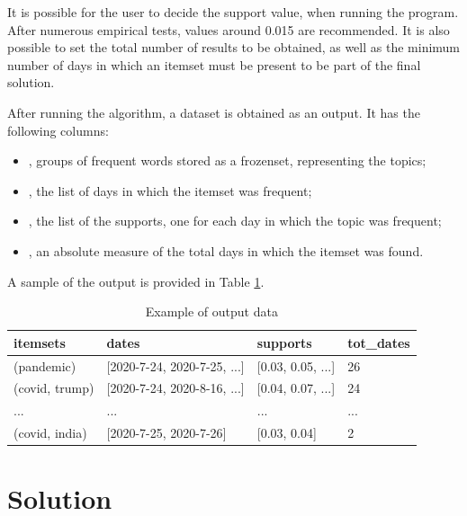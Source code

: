 It is possible for the user to decide the support value, when running the program. After numerous empirical tests, values around 0.015 are recommended. It is also possible to set the total number of results to be obtained, as well as the minimum number of days in which an itemset must be present to be part of the final solution.

After running the algorithm, a dataset is obtained as an output. It has the following columns:

\begin{itemize}
  \item {}, groups of frequent words stored as a frozenset, representing the topics;
  \item {}, the list of days in which the itemset was frequent;
  \item {}, the list of the supports, one for each day in which the topic was frequent;
  \item {}, an absolute measure of the total days in which the itemset was found.
\end{itemize}

A sample of the output is provided in Table \ref{tab_output}.

\begin{table}[h]
  \centering
  \small
  \tabcolsep=0.14cm
  \begin{tabular}{@{}llll@{}}
  \toprule
  \textbf{itemsets}         & \textbf{dates}                     & \textbf{supports}      & \textbf{tot\_dates}  \\ \midrule
  (pandemic)                & {[}2020-7-24, 2020-7-25, ...{]}    & {[}0.03, 0.05, ...{]}  & 26                   \\
  (covid, trump)            & {[}2020-7-24, 2020-8-16, ...{]}    & {[}0.04, 0.07, ...{]}  & 24                   \\
  ...                       & ...                                & ...                    & ...                  \\
  (covid, india)          & {[}2020-7-25, 2020-7-26{]}           & {[}0.03, 0.04{]}       & 2                    \\ \bottomrule
  \end{tabular}
  \caption{Example of output data \label{tab_output}}
\end{table}


\section{Solution}\label{sect_solution}

